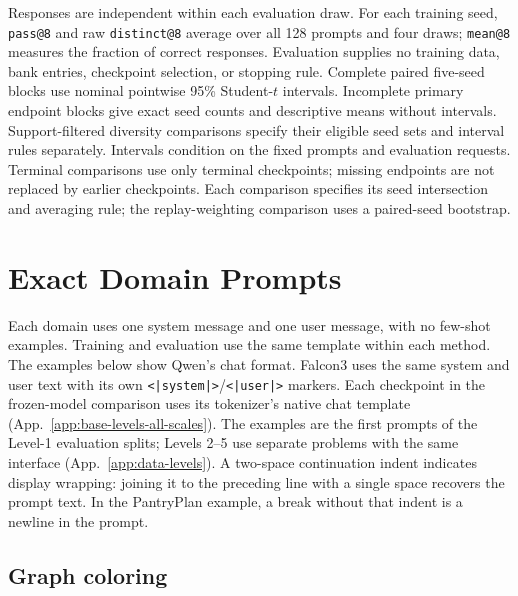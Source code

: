 \documentclass{article}
\newcommand{\1}{\mathbf 1}
\theoremstyle{remark}
\theoremstyle{definition}
\theoremstyle{plain}
\begin{document}
Responses are independent within each evaluation draw. For each training
seed, \texttt{pass@8} and raw \texttt{distinct@8} average over all 128 prompts
and four draws; \texttt{mean@8} measures the fraction of correct responses.
Evaluation supplies no training data, bank entries, checkpoint selection, or
stopping rule. Complete paired five-seed blocks use nominal pointwise 95\%
Student-$t$ intervals. Incomplete primary endpoint blocks give exact seed
counts and descriptive means without intervals. Support-filtered diversity
comparisons specify their eligible seed sets and interval rules separately.
Intervals condition on the fixed prompts and evaluation requests. Terminal comparisons use only terminal checkpoints;
missing endpoints are not replaced by earlier checkpoints. Each comparison
specifies its seed intersection and averaging rule; the replay-weighting
comparison uses a paired-seed bootstrap.


\section{Exact Domain Prompts}
\label{app:prompts}

Each domain uses one system message and one user message, with no few-shot
examples. Training and evaluation use the same template within each method.
The examples below show Qwen's chat format. Falcon3 uses the same system and
user text with its own \texttt{<|system|>}/\texttt{<|user|>} markers. Each
checkpoint in the frozen-model comparison uses its tokenizer's native chat
template (App.~\ref{app:base-levels-all-scales}). The examples are the first
prompts of the Level-1 evaluation splits; Levels 2--5 use separate problems
with the same interface (App.~\ref{app:data-levels}). A two-space continuation
indent indicates display wrapping: joining it to the preceding line with a
single space recovers the prompt text. In the PantryPlan example, a break
without that indent is a newline in the prompt.


\filbreak
\subsection{Graph coloring}
\label{app:prompt-graph}
\end{document}
